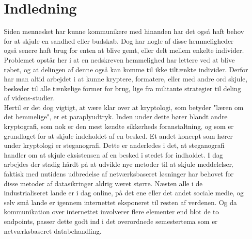 \section{Indledning}
Siden mennesket har kunne kommunikere med hinanden har det også haft behov for at skjule en sandhed eller budskab. \cite{PastCryptography} Dog har nogle af disse hemmeligheder også senere haft brug for enten at blive gemt, eller delt mellem enkelte individer. Problemet opstår her i at en nedskreven hemmelighed har lettere ved at blive røbet, og at delingen af denne også kan komme til ikke tiltænkte individer.
Derfor har man altid arbejdet i at kunne kryptere, formatere, eller med andre ord skjule, beskeder til alle tænkelige former for brug, lige fra militante strategier til deling af videns-studier. \cite{The_Invention_of_the_Internet} \\
Hertil er det dog vigtigt, at være klar over at kryptologi, som betyder "læren om det hemmelige", er et paraplyudtryk. Inden under dette hører blandt andre kryptografi, som nok er den mest kendte sikkerheds foranstaltning, og som er grundlaget for at skjule indeholdet af en besked. Et andet koncept som hører under kryptologi er steganografi. Dette er anderledes i det, at steganografi handler om at skjule eksistensen af en besked i stedet for indholdet.\cite{MeningOfCryptography} \quad \cite{MeningOfSteganografi}
I dag arbejdes der stadig hårdt på at udvikle nye metoder til at skjule meddelelser, faktisk med nutidens udbredelse af netværksbaseret løsninger har behovet for disse metoder af datasikringer aldrig været større.\cite{Internetsikkerhed_forlav} Næsten alle i de industrialiseret lande er i dag online, på det ene eller det andet sociale medie, og selv små lande er igennem internettet eksponeret til resten af verdenen. Og da kommunikation over internettet involverer flere elementer end blot de to endpoints, passer dette godt ind i det overordnede semestertema som er netværksbaseret databehandling.